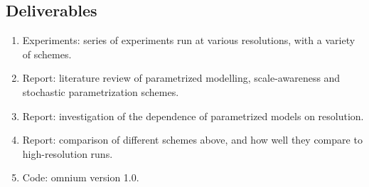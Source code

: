 \documentclass[11pt,a4paper]{article}
\begin{document}
\subsection*{Deliverables}
\begin{enumerate}
    \item Experiments: series of experiments run at various resolutions, with a variety of schemes.
    \item Report: literature review of parametrized modelling, scale-awareness and stochastic parametrization schemes.
    \item Report: investigation of the dependence of parametrized models on resolution.
    \item Report: comparison of different schemes above, and how well they compare to high-resolution runs.
    \item Code: omnium version 1.0.
\end{enumerate}


\end{document}
